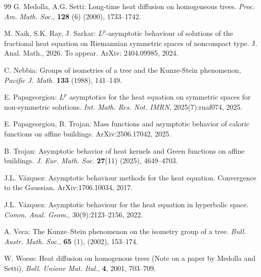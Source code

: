\documentclass[11pt,a4paper,reqno]{amsart}
\theoremstyle{plain}
\theoremstyle{remark}
\theoremstyle{definition}
\theoremstyle{remark}
\numberwithin{equation}{section}
\begin{document}
\begin{thebibliography}{99}
		 G. Medolla, A.G. Setti: Long-time heat diffusion on homogeneous trees. \textit{Proc. Am. Math. Soc.}, \textbf{128} (6) (2000),  1733--1742.

         M. Naik, S.K. Ray, J. Sarkar: $L^p$-asymptotic behaviour of solutions of the fractional heat equation on Riemannian symmetric spaces of noncompact type. {J. Anal. Math.}, 2026. To appear.  ArXiv: 2404.09985, 2024. 

 C. Nebbia: Groups of isometries of a tree and the Kunze-Stein phenomenon, \textit{Pacific J. Math.} \textbf{133} (1988), 141--149.

         E. Papageorgiou: $L^p$ asymptotics for the heat equation on symmetric spaces for non-symmetric solutions. \textit{Int. Math. Res. Not. IMRN}, 2025(7):rnaf074, 2025.

         E. Papageorgiou, B. Trojan: Mass functions and asymptotic behavior of caloric functions on affine buildings. ArXiv:2506.17042, 2025. 

         B. Trojan: Asymptotic behavior of heat kernels and Green functions on affine buildings. \textit{J. Eur. Math. Soc.} \textbf{27}(11) (2025), 4649--4703.
        
         J.L. Vázquez: Asymptotic behaviour methods for the heat equation. Convergence to the Gaussian. ArXiv:1706.10034, 2017.

         J.L. Vázquez: Asymptotic behaviour for the heat equation in hyperbolic space. \textit{Comm. Anal. Geom.}, 30(9):2123--2156, 2022.
		
		 A. Veca: The Kunze–Stein phenomenon on the isometry group of a tree. \textit{Bull. Austr. Math. Soc.}, \textbf{65} (1), (2002), 153--174.

         W. Woess: Heat diffusion on homogenous trees (Note on a paper by Medolla and Setti), \textit{Boll. Unione Mat. Ital.}, \textbf{4}, 2001, 703--709.

	\end{thebibliography}
	
\end{document}
